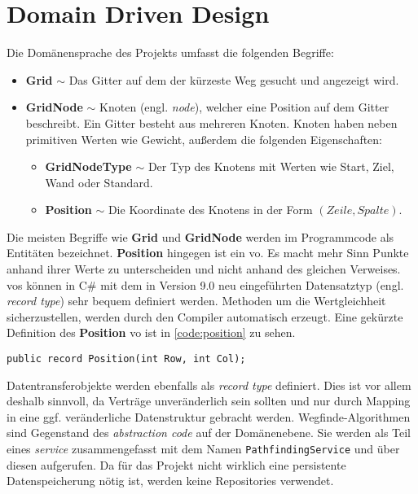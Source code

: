 \part{Domain Driven Design}
Die Domänensprache des Projekts umfasst die folgenden Begriffe:
\begin{itemize}
      \item \textbf{Grid} $\sim$ Das Gitter auf dem der kürzeste Weg gesucht und
            angezeigt wird.
      \item \textbf{GridNode} $\sim$ Knoten (engl. \textit{node}),
            welcher eine Position auf dem Gitter beschreibt. Ein
            Gitter besteht aus mehreren Knoten. Knoten haben neben
            primitiven Werten wie Gewicht, außerdem die
            folgenden Eigenschaften:
            \begin{itemize}[topsep=0pt]
                  \item \textbf{GridNodeType} $\sim$ Der Typ des Knotens mit Werten
                        wie Start, Ziel, Wand oder Standard.
                  \item \textbf{Position} $\sim$ Die Koordinate des Knotens in der
                        Form $(Zeile,Spalte)$.
            \end{itemize}
\end{itemize}
Die meisten Begriffe wie \textbf{Grid} und \textbf{GridNode} werden
im Programmcode als Entitäten bezeichnet.
\textbf{Position} hingegen ist ein \ac{vo}. Es macht mehr Sinn Punkte anhand ihrer
Werte zu unterscheiden und nicht anhand des gleichen Verweises.
\acp{vo} können in C\# mit dem in Version 9.0 neu eingeführten
Datensatztyp (engl. \textit{record type}) sehr bequem definiert werden.
Methoden um die Wertgleichheit sicherzustellen,
werden durch den Compiler automatisch erzeugt.
Eine gekürzte Definition des \textbf{Position} \ac{vo} ist in \autoref{code:position}
zu sehen.
\begin{lstlisting}[caption={Der Datensatztyp einer Koordinate},label={code:position}]
public record Position(int Row, int Col);
\end{lstlisting}
Datentransferobjekte werden ebenfalls als \textit{record type} definiert.
Dies ist vor allem deshalb sinnvoll, da Verträge unveränderlich sein sollten
und nur durch Mapping in eine ggf. veränderliche Datenstruktur gebracht werden.
Wegfinde-Algorithmen sind Gegenstand des \textit{abstraction code} auf
der Domänenebene. Sie werden als Teil eines \textit{service}
zusammengefasst mit dem Namen \texttt{Path\-findingService} und
über diesen aufgerufen. Da für das Projekt nicht wirklich
eine persistente Datenspeicherung nötig ist, werden keine
Repositories verwendet.